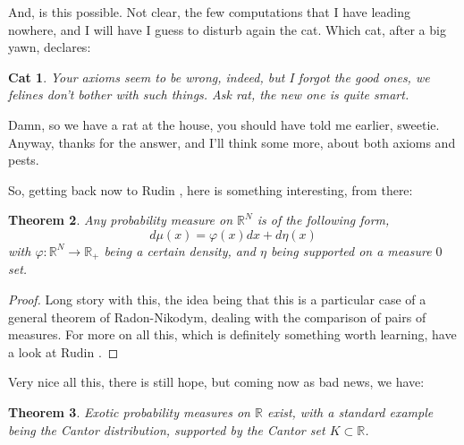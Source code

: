 \documentclass[12pt]{amsbook}
\newtheorem{theorem}{Theorem}[chapter]
\newtheorem{cat}[theorem]{Cat}
\begin{document}
And, is this possible. Not clear, the few computations that I have leading nowhere, and I will have I guess to disturb again the cat. Which cat, after a big yawn, declares:

\begin{cat}
Your axioms seem to be wrong, indeed, but I forgot the good ones, we felines don't bother with such things. Ask rat, the new one is quite smart.
\end{cat}

Damn, so we have a rat at the house, you should have told me earlier, sweetie. Anyway, thanks for the answer, and I'll think some more, about both axioms and pests.

\bigskip

So, getting back now to Rudin \cite{rud}, here is something interesting, from there:

\begin{theorem}
Any probability measure on $\mathbb R^N$ is of the following form,
$$d\mu(x)=\varphi(x)dx+d\eta(x)$$
with $\varphi:\mathbb R^N\to\mathbb R_+$ being a certain density, and $\eta$ being supported on a measure $0$ set.
\end{theorem}

\begin{proof}
Long story with this, the idea being that this is a particular case of a general theorem of Radon-Nikodym, dealing with the comparison of pairs of measures. For more on all this, which is definitely something worth learning, have a look at Rudin \cite{rud}.
\end{proof}

Very nice all this, there is still hope, but coming now as bad news, we have:

\begin{theorem}
Exotic probability measures on $\mathbb R$ exist, with a standard example being the Cantor distribution, supported by the Cantor set $K\subset\mathbb R$.
\end{theorem}
\end{document}

